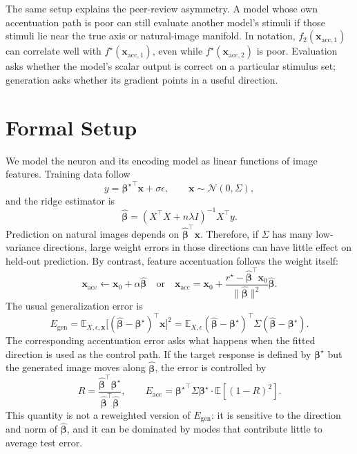 \documentclass{article}
\newcommand{\bhat}{\widehat{\boldsymbol{\beta}}}
\newcommand{\btrue}{\boldsymbol{\beta}^{\star}}
\newcommand{\x}{\mathbf{x}}
\newcommand{\Eacc}{E_{\mathrm{acc}}}
\begin{document}
The same setup explains the peer-review asymmetry. A model whose own accentuation path is poor can still evaluate another model's stimuli if those stimuli lie near the true axis or natural-image manifold. In notation, $f_2(\x_{\mathrm{acc},1})$ can correlate well with $f^\star(\x_{\mathrm{acc},1})$, even while $f^\star(\x_{\mathrm{acc},2})$ is poor. Evaluation asks whether the model's scalar output is correct on a particular stimulus set; generation asks whether its gradient points in a useful direction.

\section{Formal Setup}

We model the neuron and its encoding model as linear functions of image features. Training data follow
\begin{equation}
    y = {\btrue}^{\top} \x + \sigma \epsilon,
    \qquad \x\sim\mathcal{N}(0,\Sigma),
    \label{eq:linear_model}
\end{equation}
and the ridge estimator is
\begin{equation}
    \bhat = (X^\top X + n\lambda I)^{-1}X^\top y.
    \label{eq:ridge_estimator}
\end{equation}
Prediction on natural images depends on $\bhat^\top\x$. Therefore, if $\Sigma$ has many low-variance directions, large weight errors in those directions can have little effect on held-out prediction. By contrast, feature accentuation follows the weight itself:
\begin{equation}
    \x_{\mathrm{acc}} \leftarrow \x_0 + \alpha \bhat
    \quad\text{or}\quad
    \x_{\mathrm{acc}} = \x_0 + \frac{r^\star-\bhat^\top\x_0}{\|\bhat\|^2}\bhat .
    \label{eq:accentuation_path}
\end{equation}
The usual generalization error is
\begin{equation}
    E_{\mathrm{gen}} =
    \mathbb{E}_{X,\epsilon,\x}\bigl[(\bhat-\btrue)^\top \x\bigr]^2
    =
    \mathbb{E}_{X,\epsilon}(\bhat-\btrue)^\top\Sigma(\bhat-\btrue).
    \label{eq:gen_error}
\end{equation}
The corresponding accentuation error asks what happens when the fitted direction is used as the control path. If the target response is defined by $\btrue$ but the generated image moves along $\bhat$, the error is controlled by
\begin{equation}
    R=\frac{\bhat^\top\btrue}{\bhat^\top\bhat},
    \qquad
    \Eacc = {\btrue}^{\top}\Sigma\btrue \cdot \mathbb{E}\left[(1-R)^2\right].
    \label{eq:acc_error}
\end{equation}
This quantity is not a reweighted version of $E_{\mathrm{gen}}$: it is sensitive to the direction and norm of $\bhat$, and it can be dominated by modes that contribute little to average test error.
\end{document}
